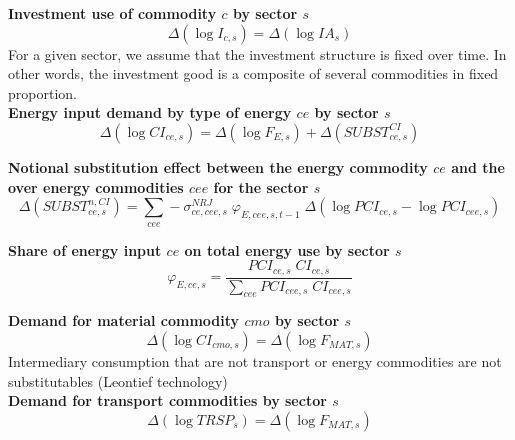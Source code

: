 \documentclass[12pt]{article}
\numberwithin{equation}{section}
\begin{document}
\noindent\textbf{Investment use of commodity $c$ by sector $s$} \\
\begin{dmath}
\varDelta \left(\operatorname{log} I_{c, s}\right) = \varDelta \left(\operatorname{log} IA_{s}\right)
\end{dmath}
For a given sector, we assume that the investment structure is fixed over time. In other words, the investment good is a composite of several commodities in fixed proportion. \\

\noindent\textbf{Energy input demand by type of energy $ce$ by sector $s$} \\
\begin{dmath}
\varDelta \left(\operatorname{log} CI_{ce, s}\right) = \varDelta \left(\operatorname{log} F_{E, s}\right) + \varDelta \left(SUBST^{CI}_{ce, s}\right)
\end{dmath}

\noindent\textbf{Notional substitution effect between the energy commodity $ce$ and the over energy commodities $cee$ for the sector $s$} \\
\begin{dmath}
\varDelta \left(SUBST^{n,CI}_{ce, s}\right) = \sum_{cee} -\sigma^{NRJ}_{ce, cee, s} \; \varphi_{E, cee, s, t-1} \; \varDelta \left(\operatorname{log} PCI_{ce, s} - \operatorname{log} PCI_{cee, s}\right)
\end{dmath}

\noindent\textbf{Share of energy input $ce$  on total energy use by sector $s$} \\
\begin{dmath}
\varphi_{E, ce, s} = \frac{PCI_{ce, s} \; CI_{ce, s}}{\sum_{cee} PCI_{cee, s} \; CI_{cee, s}}
\end{dmath}

\noindent\textbf{Demand for material commodity $cmo$ by sector $s$} \\
\begin{dmath}
\varDelta \left(\operatorname{log} CI_{cmo, s}\right) = \varDelta \left(\operatorname{log} F_{MAT, s}\right)
\end{dmath}
Intermediary consumption that are not transport or energy commodities are not substitutables (Leontief technology)  \\

\noindent\textbf{Demand for transport commodities by sector $s$} \\
\begin{dmath}
\varDelta \left(\operatorname{log} TRSP_{s}\right) = \varDelta \left(\operatorname{log} F_{MAT, s}\right)
\end{dmath}
\end{document}
